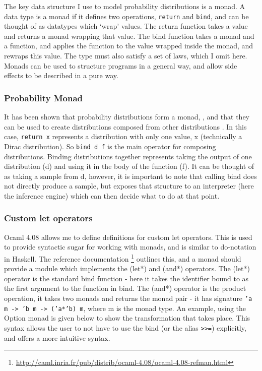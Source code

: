 The key data structure I use to model probability distributions is a monad. A data type is a monad if it defines two operations, \texttt{return} and \texttt{bind}, and can be thought of as datatypes which `wrap' values. The return function takes a value and returns a monad wrapping that value. The bind function takes a monad and a function, and applies the function to the value wrapped inside the monad, and rewraps this value. The type must also satisfy a set of laws, which I omit here\cite{wadler1990comprehending}. Monads can be used to structure programs in a general way, and allow side effects to be described in a pure way.
	
\subsubsection{Probability Monad}
It has been shown that probability distributions form a monad, \cite{giry1982categorical} \cite{jones1989probabilistic}, and that they can be used to create distributions composed from other distributions \cite{ramsey2002stochastic}. In this case, \texttt{return x} represents a distribution with only one value, x (technically a Dirac distribution). So \texttt{bind d f} is the main operator for composing distributions. Binding distributions together represents taking the output of one distribution (d) and using it in the body of the function (f). It can be thought of as taking a sample from d, however, it is important to note that calling bind does not directly produce a sample, but exposes that structure to an interpreter (here the inference engine) which can then decide what to do at that point.

\subsubsection{Custom let operators}
Ocaml 4.08 allows me to define definitions for custom let operators. This is used to provide syntactic sugar for working with monads, and is similar to do-notation in Haskell. The reference documentation \footnote{\url{http://caml.inria.fr/pub/distrib/ocaml-4.08/ocaml-4.08-refman.html}} outlines this, and a monad should provide a module which implements the (let*) and (and*) operators. The (let*) operator is the standard bind function - here it takes the identifier bound to as the first argument to the function in bind. The (and*) operator is the product operation, it takes two monads and returns the monad pair - it has signature \texttt{'a m -> 'b m -> ('a*'b) m}, where m is the monad type. An example, using the Option monad is given below to show the transformation that takes place. This syntax allows the user to not have to use the bind (or the alias \texttt{>>=}) explicitly, and offers a more intuitive syntax.

